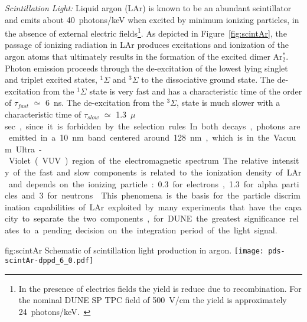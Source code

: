 \emph{Scintillation Light:} Liquid argon (LAr) is known to be an abundant scintillator and emits about \SI{40}{photons/keV} when excited  by minimum ionizing particles\cite{Doke:1990rza},
in the absence of external electric fields\footnote{In the presence of electrics fields the yield is reduce due to recombination. For the nominal DUNE SP TPC field of \SI{500}{V/cm}  the yield is approximately \SI{24}{photons/keV.}\cite{PhysRevB.20.3486}}. 
As depicted in Figure~\ref{fig:scintAr}, the passage of ionizing radiation in LAr produces excitations and ionization of the argon atoms that ultimately results in the formation of the excited dimer Ar$^*_2$.  
Photon emission proceeds through the de-excitation of the lowest lying singlet and triplet excited states, $^{1}\Sigma$ and 
$^{3}\Sigma$ to the dissociative ground state. The de-excitation from the $^{1}\Sigma$ state is very fast and has a characteristic time of the order of 
$\tau_{fast}$ $\simeq$ \SI{6}{ns}. The de-excitation from the $^{3}\Sigma$, state is much slower with a characteristic time of $\tau_{slow}$ $\simeq$ \SI{1.3}{$\mu$sec}, since it is forbidden by the selection rules. 
In both decays, photons are emitted in a \SI{10}{nm} band centered around \SI{128}{nm}, which is in the Vacuum Ultra-Violet (VUV) region of the electromagnetic spectrum.
The relative intensity of the  fast and slow components is related to the ionization density of LAr and depends on the ionizing particle: \num{0.3} for electrons,\num{1.3} for alpha particles and \num{3} for neutrons\cite{PhysRevB.27.5279}.
This phenomena is the basis for the  particle discrimination capabilities of LAr exploited by many experiments that have the capacity to separate the two components, for DUNE the greatest significance relates to a pending decision on the integration period of the light signal. 

\begin{dunefigure}{fig:scintAr}
{Schematic of scintillation light production in argon.}
\texttt{[image: pds-scintAr-dppd\_6\_0.pdf]}
\end{dunefigure}

